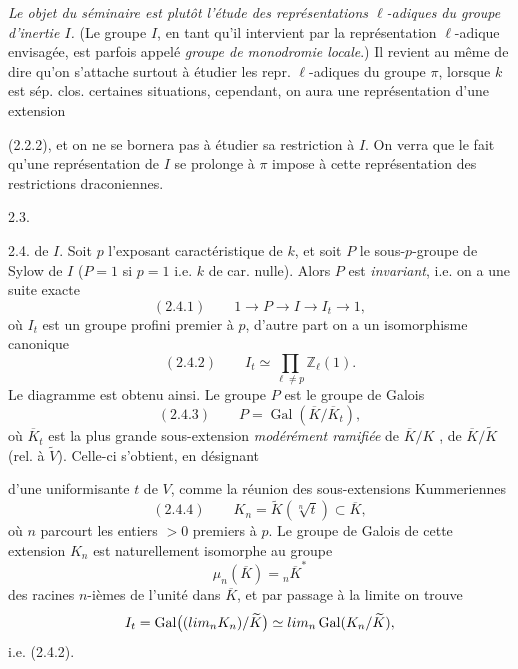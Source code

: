\documentclass[11pt,a4paper]{article}
\begin{document}
\emph{Le objet du séminaire est plutôt l'étude des représentations $\ell$-adiques du groupe d'inertie $I$.} (Le groupe $I$, en tant qu'il intervient par la représentation $\ell$-adique envisagée,  est parfois appelé \emph{groupe de monodromie locale}.) Il revient au même de dire qu'on s'attache surtout à étudier les repr. $\ell$-adiques du groupe $\pi$, lorsque $k$ est sép. clos.  certaines situations, cependant, on aura une représentation d'une extension

(2.2.2), et on ne se bornera pas \struck{\ill{}} à étudier sa restriction à $I$. On verra   que le fait qu'une représentation de $I$ se prolonge à $\pi$ impose à cette représentation des restrictions draconiennes.

2.3.

2.4.   de $I$. Soit $p$ l'exposant caractéristique de $k$,  et soit $P$ le  sous-$p$-groupe de Sylow de $I$ ($P = 1$ si $p = 1$ i.e. $k$ de car. nulle). Alors $P$ est \emph{invariant}, i.e. on a une suite exacte
\[
  (2.4.1) \qquad 1 \longrightarrow P \longrightarrow I \longrightarrow I_t \longrightarrow 1 ,
\]
où $I_t$  est un groupe profini premier à $p$, d'autre part on a un isomorphisme canonique
\[
  (2.4.2) \qquad I_t \simeq \prod_{\ell \neq p} \mathbb{Z}_\ell(1) .
\]
Le diagramme est obtenu ainsi. Le groupe $P$ est le groupe de Galois 
\[
  (2.4.3) \qquad P = \operatorname{Gal}(\overline{K}/\overline{K}_t) ,
\]
où $\overline{K}_t$ est la plus  grande sous-extension \emph{modérément ramifiée} de $\overline{K}/K$ ,  de $\overline{K}/\widetilde{K}$ (rel. à $\widetilde{V}$). Celle-ci s'obtient, en désignant

d'une uniformisante \struck{\ill{}} $t$ de $V$,  comme la réunion des sous-extensions  Kummeriennes
\[
  (2.4.4) \qquad K_n = \widetilde{K}(\sqrt[n]{t}) \subset \overline{K} ,
\]
où $n$ parcourt les entiers ${}>0$ premiers à $p$. Le groupe de Galois de cette extension $K_n$ est naturellement isomorphe au groupe
\[
  \mu_n(\overline{K}) = {}_n\overline{K}^{*}
\]
des racines $n$-ièmes de l'unité dans $\overline{K}$, et par passage à la limite on trouve
\[
  I_t = \operatorname{Gal}\bigl((\varinjlim_n K_n)/\widetilde{K}\bigr) \simeq \varprojlim_n \operatorname{Gal}(K_n/\widetilde{K}) ,
\]
i.e. (2.4.2).
\end{document}
